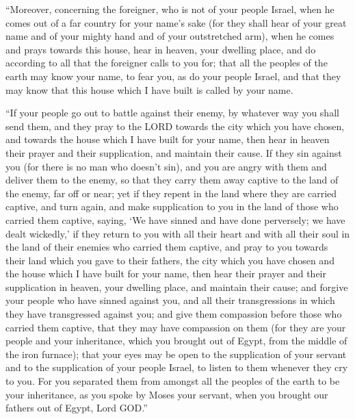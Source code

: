  ``Moreover, concerning the foreigner, who is not of your
people Israel, when he comes out of a far country for your name's sake
 (for they shall hear of your great name and of your mighty
hand and of your outstretched arm), when he comes and prays towards this
house,  hear in heaven, your dwelling place, and do
according to all that the foreigner calls to you for; that all the
peoples of the earth may know your name, to fear you, as do your people
Israel, and that they may know that this house which I have built is
called by your name.

 ``If your people go out to battle against their enemy, by
whatever way you shall send them, and they pray to the LORD towards the
city which you have chosen, and towards the house which I have built for
your name,  then hear in heaven their prayer and their
supplication, and maintain their cause.  If they sin
against you (for there is no man who doesn't sin), and you are angry
with them and deliver them to the enemy, so that they carry them away
captive to the land of the enemy, far off or near;  yet if
they repent in the land where they are carried captive, and turn again,
and make supplication to you in the land of those who carried them
captive, saying, `We have sinned and have done perversely; we have dealt
wickedly,'  if they return to you with all their heart and
with all their soul in the land of their enemies who carried them
captive, and pray to you towards their land which you gave to their
fathers, the city which you have chosen and the house which I have built
for your name,  then hear their prayer and their
supplication in heaven, your dwelling place, and maintain their cause;
 and forgive your people who have sinned against you, and
all their transgressions in which they have transgressed against you;
and give them compassion before those who carried them captive, that
they may have compassion on them  (for they are your people
and your inheritance, which you brought out of Egypt, from the middle of
the iron furnace);  that your eyes may be open to the
supplication of your servant and to the supplication of your people
Israel, to listen to them whenever they cry to you.  For
you separated them from amongst all the peoples of the earth to be your
inheritance, as you spoke by Moses your servant, when you brought our
fathers out of Egypt, Lord GOD.''

